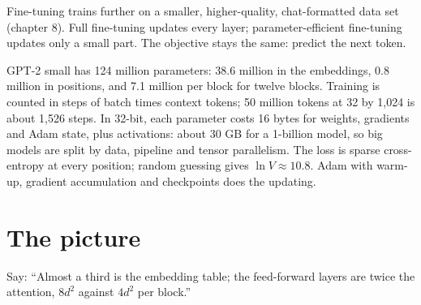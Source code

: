 \begin{remark}
Fine-tuning trains further on a smaller, higher-quality, chat-formatted data set (chapter 8). Full fine-tuning updates every layer; parameter-efficient fine-tuning updates only a small part. The objective stays the same: predict the next token.
\end{remark}

\begin{sayit}
GPT-2 small has 124 million parameters: 38.6 million in the embeddings, 0.8 million in positions, and 7.1 million per block for twelve blocks. Training is counted in steps of batch times context tokens; 50 million tokens at 32 by 1,024 is about 1,526 steps. In 32-bit, each parameter costs 16 bytes for weights, gradients and Adam state, plus activations: about 30 GB for a 1-billion model, so big models are split by data, pipeline and tensor parallelism. The loss is sparse cross-entropy at every position; random guessing gives $\ln V \approx 10.8$. Adam with warm-up, gradient accumulation and checkpoints does the updating.
\end{sayit}

\section{The picture}

\begin{sayit}
\begin{pic}
\end{pic}
Say: ``Almost a third is the embedding table; the feed-forward layers are twice the attention, $8d^2$ against $4d^2$ per block.''
\end{sayit}

